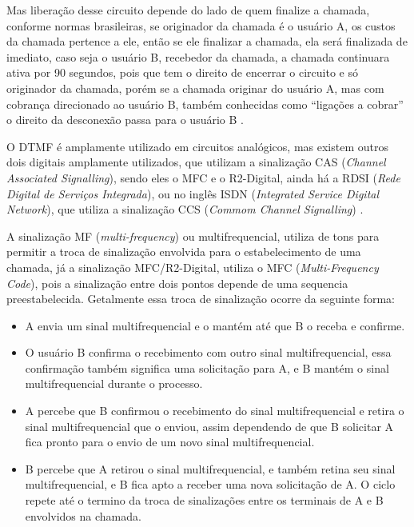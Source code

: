 Mas liberação desse circuito depende do lado de quem finalize a chamada, conforme normas brasileiras, se originador da chamada é o usuário A, os custos da chamada pertence a ele, então se ele finalizar a chamada, ela será finalizada de imediato, caso seja o usuário B, recebedor da chamada, a chamada continuara ativa por 90 segundos, pois que tem o direito de encerrar o circuito e só originador da chamada, porém se a chamada originar do usuário A, mas com cobrança direcionado ao usuário B, também conhecidas como “ligações a cobrar” o direito da desconexão passa para o usuário B \cite{andersonramires2005}.

O DTMF é amplamente utilizado em circuitos analógicos, mas existem outros dois digitais amplamente utilizados, que utilizam a sinalização CAS (\textit{Channel Associated Signalling}), sendo eles o MFC e o R2-Digital, ainda há a RDSI (\textit{Rede Digital de Serviços Integrada}), ou no inglês ISDN (\textit{Integrated Service Digital Network}), que utiliza a sinalização CCS (\textit{Commom Channel Signalling}) \cite{alexandrekeller2014}.

A sinalização MF (\textit{multi-frequency}) ou multifrequencial, utiliza de tons para permitir a troca de sinalização envolvida para o estabelecimento de uma chamada, já a sinalização MFC/R2-Digital, utiliza o MFC (\textit{Multi-Frequency Code}), pois a sinalização entre dois pontos depende de uma sequencia preestabelecida. Getalmente essa troca de sinalização ocorre da seguinte forma: \cite{davidson2008}

\begin{itemize}
  \item A envia um sinal multifrequencial e o mantém até que B o receba e confirme.
  \item O usuário B confirma o recebimento com outro sinal multifrequencial, essa confirmação também significa uma solicitação para A, e B mantém o sinal multifrequencial durante o processo.
  \item A percebe que B confirmou o recebimento do sinal multifrequencial e retira o sinal multifrequencial que o enviou, assim dependendo de que B solicitar A fica pronto para o envio de um novo sinal multifrequencial.
  \item B percebe que A retirou o sinal multifrequencial, e também retina seu sinal multifrequencial, e B fica apto a receber uma nova solicitação de A. O ciclo repete até o termino da troca de sinalizações entre os terminais de A e B envolvidos na chamada.
\end{itemize}

